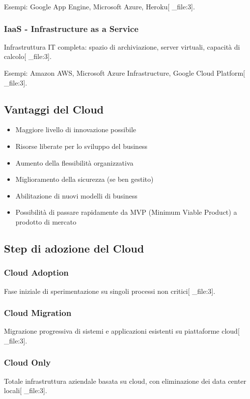 \documentclass[12pt,a4paper]{article}
\begin{document}
Esempi: Google App Engine, Microsoft Azure, Heroku[ _file:3].

\subsubsection{IaaS - Infrastructure as a Service}
Infrastruttura IT completa: spazio di archiviazione, server virtuali, capacità di calcolo[ _file:3].

Esempi: Amazon AWS, Microsoft Azure Infrastructure, Google Cloud Platform[ _file:3].

\subsection{Vantaggi del Cloud}
\begin{itemize}
    \item Maggiore livello di innovazione possibile
    \item Risorse liberate per lo sviluppo del business
    \item Aumento della flessibilità organizzativa
    \item Miglioramento della sicurezza (se ben gestito)
    \item Abilitazione di nuovi modelli di business
    \item Possibilità di passare rapidamente da MVP (Minimum Viable Product) a prodotto di mercato
\end{itemize}

\subsection{Step di adozione del Cloud}

\subsubsection{Cloud Adoption}
Fase iniziale di sperimentazione su singoli processi non critici[ _file:3].

\subsubsection{Cloud Migration}
Migrazione progressiva di sistemi e applicazioni esistenti su piattaforme cloud[ _file:3].

\subsubsection{Cloud Only}
Totale infrastruttura aziendale basata su cloud, con eliminazione dei data center locali[ _file:3].
\end{document}
